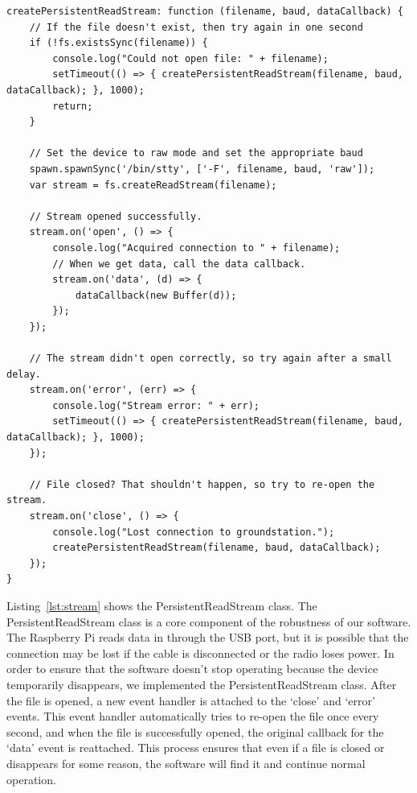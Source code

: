 \documentclass[10pt,draftclsnofoot,onecolumn]{IEEEtran}
\begin{document}
\newpage
\begin{lstlisting}[caption={PersistentReadStream class},label={lst:stream}]
createPersistentReadStream: function (filename, baud, dataCallback) {
	// If the file doesn't exist, then try again in one second
	if (!fs.existsSync(filename)) {
		console.log("Could not open file: " + filename);
		setTimeout(() => { createPersistentReadStream(filename, baud, dataCallback); }, 1000);
		return;
	}

	// Set the device to raw mode and set the appropriate baud
	spawn.spawnSync('/bin/stty', ['-F', filename, baud, 'raw']);
	var stream = fs.createReadStream(filename);

	// Stream opened successfully.
	stream.on('open', () => {
		console.log("Acquired connection to " + filename);
		// When we get data, call the data callback.
		stream.on('data', (d) => {
			dataCallback(new Buffer(d));
		});
	});

	// The stream didn't open correctly, so try again after a small delay.
	stream.on('error', (err) => {
		console.log("Stream error: " + err);
		setTimeout(() => { createPersistentReadStream(filename, baud, dataCallback); }, 1000);
	});

	// File closed? That shouldn't happen, so try to re-open the stream.
	stream.on('close', () => {
		console.log("Lost connection to groundstation.");
		createPersistentReadStream(filename, baud, dataCallback);
	});
}
\end{lstlisting}
Listing~\ref{lst:stream} shows the PersistentReadStream class.
The PersistentReadStream class is a core component of the robustness of our software.
The Raspberry Pi reads data in through the USB port,
but it is possible that the connection may be lost if the cable is disconnected or the radio loses power.
In order to ensure that the software doesn't stop operating because the device temporarily disappears,
we implemented the PersistentReadStream class.
After the file is opened, a new event handler is attached to the `close' and `error' events.
This event handler automatically tries to re-open the file once every second, and when the file is successfully
opened, the original callback for the `data' event is reattached.
This process ensures that even if a file is closed or disappears for some reason,
the software will find it and continue normal operation.







	
\printindex


\end{document}

